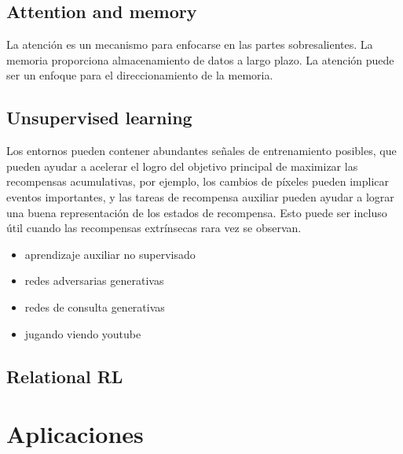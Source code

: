 \documentclass{svproc}
\begin{document}
\subsection{Attention and memory}
La atención es un mecanismo para enfocarse en las partes sobresalientes. La memoria proporciona almacenamiento de datos a largo plazo. La atención puede ser un enfoque para el direccionamiento de la memoria.

\subsection{Unsupervised learning}
Los entornos pueden contener abundantes señales de entrenamiento posibles, que pueden ayudar a acelerar el logro del objetivo principal de maximizar las recompensas acumulativas, por ejemplo, los cambios de píxeles pueden implicar eventos importantes, y las tareas de recompensa auxiliar pueden ayudar a lograr una buena representación de los estados de recompensa. Esto puede ser incluso útil cuando las recompensas extrínsecas rara vez se observan.

\begin{itemize}
    \item aprendizaje auxiliar no supervisado
    \item redes adversarias generativas
    \item redes de consulta generativas
    \item jugando viendo youtube
    
    
\end{itemize}

\subsection{Relational RL}


\section{Aplicaciones}\label{ch:aplicaciones}
\end{document}
